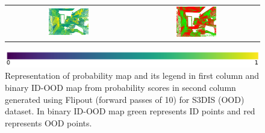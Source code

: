 \begin{figure}[h!]
\begin{tabular}{cc}
            \includegraphics[width=0.33\textwidth, height=0.18\textheight]{images/ood_imgs/fout_s3dis/ofc_42_fout_prob.pdf}& 
            \includegraphics[width=0.33\textwidth, height=0.18\textheight]{images/ood_imgs/fout_s3dis/fout_prob_1.pdf}\\
        \end{tabular}
        \includegraphics[scale=0.45]{images/prob_legend.pdf}
        \caption{Representation of probability map and its legend in first column and binary ID-OOD map from probability scores in second column generated using Flipout (forward passes of 10) for S3DIS (OOD) dataset. In binary ID-OOD map green represents ID points and red represents OOD points.}
        \label{fig:fout_s3dis_oodmap_prob}
    \end{figure}


